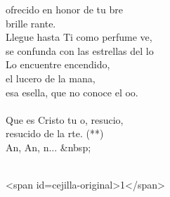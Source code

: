 \begin{cancion}
\begin{chorus}
	ofrecido en honor de tu bre\\
	brille rante.\\
	Llegue hasta Ti como perfume ve,\\
	se confunda con las estrellas del lo\\
Lo encuentre encendido,\\
	el lucero de la mana,\\
	esa esella, que no conoce el oo.\\
\jump\\
	Que es Cristo tu o, resucio,\\
	resucido de la rte. (**)\\
	An, An, n... &nbsp; \\
	\end{chorus}%
	\jump\\
<span id=cejilla-original>1</span>\\
\end{cancion}%
